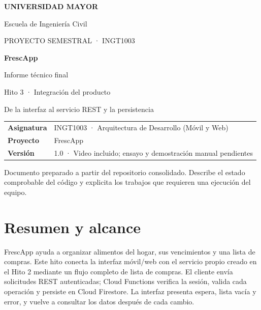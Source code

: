 \documentclass[11pt,a4paper]{article}
\begin{document}
\thispagestyle{empty}
\vspace*{1.45cm}
{\color{white}\Large\bfseries UNIVERSIDAD MAYOR\par}
{\color{white!85}\large Escuela de Ingeniería Civil\par}
\vspace{2.25cm}
{\color{white!75}\large PROYECTO SEMESTRAL · INGT1003\par}
\vspace{0.35cm}
{\color{white}\Huge\bfseries FrescApp\par}
\vspace{0.15cm}
{\color{white}\LARGE Informe técnico final\par}
{\color{white!90}\Large Hito 3 · Integración del producto\par}
\vspace{1.1cm}
{\color{white!85}\large De la interfaz al servicio REST y la persistencia\par}
\vfill
\begin{tabularx}{\textwidth}{>{\bfseries}p{3.4cm}Y}
Asignatura & INGT1003 · Arquitectura de Desarrollo (Móvil y Web)\\
Proyecto & FrescApp\\
Versión & 1.0 · Video incluido; ensayo y demostración manual pendientes\\
\end{tabularx}
\vspace{1.25cm}
\begin{center}\small\color{gris}Documento preparado a partir del repositorio consolidado. Describe el estado comprobable del código y explicita los trabajos que requieren una ejecución del equipo.\end{center}
\newpage

\tableofcontents
\newpage

\section{Resumen y alcance}
FrescApp ayuda a organizar alimentos del hogar, sus vencimientos y una lista de compras. Este hito conecta la interfaz móvil/web con el servicio propio creado en el Hito 2 mediante un flujo completo de lista de compras. El cliente envía solicitudes REST autenticadas; Cloud Functions verifica la sesión, valida cada operación y persiste en Cloud Firestore. La interfaz presenta espera, lista vacía y error, y vuelve a consultar los datos después de cada cambio.
\end{document}
